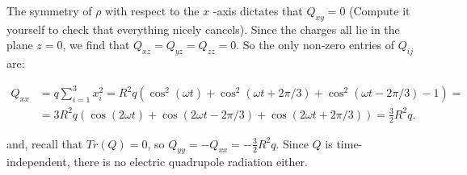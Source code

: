 The symmetry of $\rho$ with respect to the $x$ -axis dictates that $Q_{x y}=0 $ (Compute it yourself to check that everything nicely cancels). Since the charges all lie in the plane $z=0$, we find that  $Q_{x z}=Q_{y z}=Q_{z z}=0$. So the only non-zero entries of $Q_{ij}$ are:

\begin{equation}
	\begin{split}
		Q_{x x} &=q \sum_{i=1}^{3} x_{i}^{2}=R^{2} q\left(\cos ^{2}(\omega t)+\cos ^{2}(\omega t+2 \pi / 3)+\cos ^{2}(\omega t-2 \pi / 3) -1 \right) =\\
		&=3 R^{2} q(\cos (2 \omega t)+\cos (2 \omega t-2 \pi / 3)+\cos (2 \omega t+2 \pi / 3))=\frac{3}{2} R^{2} q.
	\end{split}
\end{equation}

and, recall that $Tr (Q) =0$, so $Q_{y y}= - Q_{x x}=-\frac{3}{2} R^{2} q .$ Since $Q$ is time-independent, there is no electric quadrupole radiation either.
